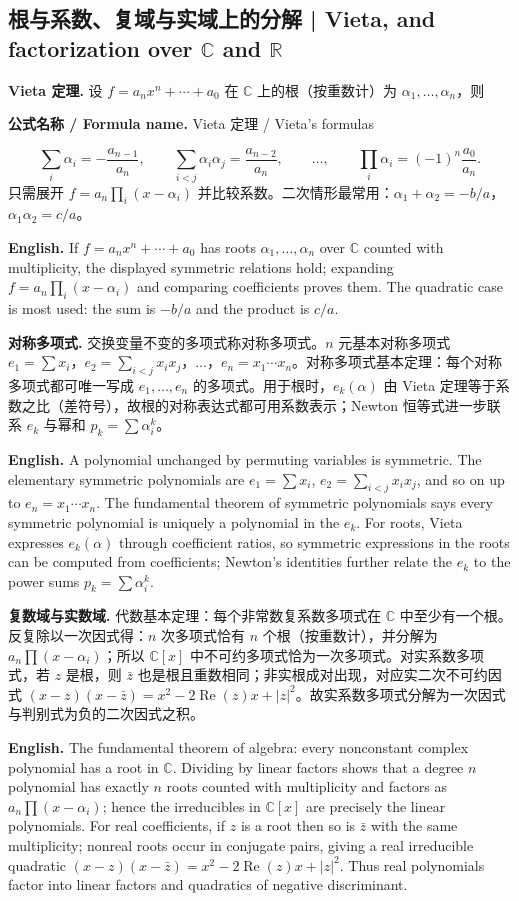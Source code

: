 \documentclass[UTF8,11pt,a4paper]{ctexart}
\newcommand{\EN}[1]{\par\noindent\textbf{English.} #1\par}
\newcommand{\FORMULA}[2]{\par\noindent\textbf{公式名称 / Formula name.} #1 / #2\par}
\begin{document}
\subsection{根与系数、复域与实域上的分解 | Vieta, and factorization over \texorpdfstring{$\mathbb C$}{C} and \texorpdfstring{$\mathbb R$}{R}}
\noindent\textbf{Vieta 定理.} 设 $f=a_nx^n+\cdots+a_0$ 在 $\mathbb C$ 上的根（按重数计）为 $\alpha_1,\dots,\alpha_n$，则
\FORMULA{Vieta 定理}{Vieta's formulas}
\[
\sum_i\alpha_i=-\frac{a_{n-1}}{a_n},\qquad
\sum_{i<j}\alpha_i\alpha_j=\frac{a_{n-2}}{a_n},\qquad\ldots,\qquad
\prod_i\alpha_i=(-1)^n\frac{a_0}{a_n}.
\]
只需展开 $f=a_n\prod_i(x-\alpha_i)$ 并比较系数。二次情形最常用：$\alpha_1+\alpha_2=-b/a$，$\alpha_1\alpha_2=c/a$。
\EN{If $f=a_nx^n+\cdots+a_0$ has roots $\alpha_1,\dots,\alpha_n$ over $\mathbb C$ counted with multiplicity, the displayed symmetric relations hold; expanding $f=a_n\prod_i(x-\alpha_i)$ and comparing coefficients proves them. The quadratic case is most used: the sum is $-b/a$ and the product is $c/a$.}
\noindent\textbf{对称多项式.} 交换变量不变的多项式称对称多项式。$n$ 元基本对称多项式 $e_1=\sum x_i$，$e_2=\sum_{i<j}x_ix_j$，$\dots$，$e_n=x_1\cdots x_n$。对称多项式基本定理：每个对称多项式都可唯一写成 $e_1,\dots,e_n$ 的多项式。用于根时，$e_k(\alpha)$ 由 Vieta 定理等于系数之比（差符号），故根的对称表达式都可用系数表示；Newton 恒等式进一步联系 $e_k$ 与幂和 $p_k=\sum\alpha_i^k$。
\EN{A polynomial unchanged by permuting variables is symmetric. The elementary symmetric polynomials are $e_1=\sum x_i$, $e_2=\sum_{i<j}x_ix_j$, and so on up to $e_n=x_1\cdots x_n$. The fundamental theorem of symmetric polynomials says every symmetric polynomial is uniquely a polynomial in the $e_k$. For roots, Vieta expresses $e_k(\alpha)$ through coefficient ratios, so symmetric expressions in the roots can be computed from coefficients; Newton's identities further relate the $e_k$ to the power sums $p_k=\sum\alpha_i^k$.}
\noindent\textbf{复数域与实数域.} 代数基本定理：每个非常数复系数多项式在 $\mathbb C$ 中至少有一个根。反复除以一次因式得：$n$ 次多项式恰有 $n$ 个根（按重数计），并分解为 $a_n\prod(x-\alpha_i)$；所以 $\mathbb C[x]$ 中不可约多项式恰为一次多项式。对实系数多项式，若 $z$ 是根，则 $\bar z$ 也是根且重数相同；非实根成对出现，对应实二次不可约因式 $(x-z)(x-\bar z)=x^2-2\operatorname{Re}(z)x+|z|^2$。故实系数多项式分解为一次因式与判别式为负的二次因式之积。
\EN{The fundamental theorem of algebra: every nonconstant complex polynomial has a root in $\mathbb C$. Dividing by linear factors shows that a degree $n$ polynomial has exactly $n$ roots counted with multiplicity and factors as $a_n\prod(x-\alpha_i)$; hence the irreducibles in $\mathbb C[x]$ are precisely the linear polynomials. For real coefficients, if $z$ is a root then so is $\bar z$ with the same multiplicity; nonreal roots occur in conjugate pairs, giving a real irreducible quadratic $(x-z)(x-\bar z)=x^2-2\operatorname{Re}(z)x+|z|^2$. Thus real polynomials factor into linear factors and quadratics of negative discriminant.}
\end{document}
